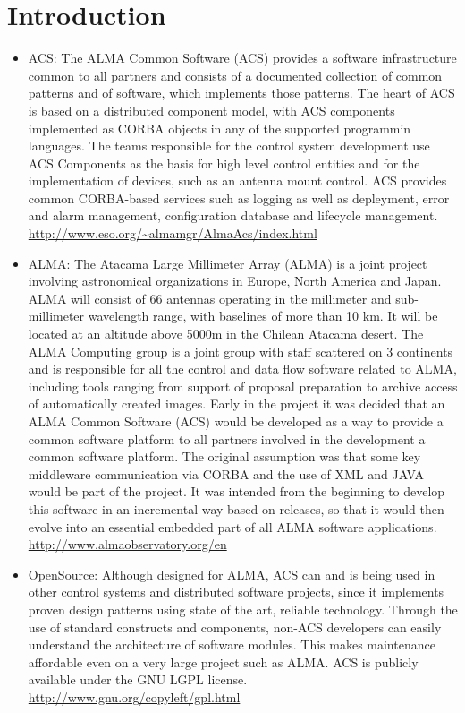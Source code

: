 \section{Introduction}
\begin{itemize}
	\item ACS: The ALMA Common Software (ACS) provides a software infrastructure common to all partners and consists of a documented collection of common patterns 
		and of software, which implements those patterns. The heart of ACS is based on a distributed component model, with ACS components implemented as CORBA
		objects in any of the supported programmin languages. The teams responsible for the control system development use ACS Components as the basis for 
		high level control entities and for the implementation of devices, such as an antenna mount control. ACS provides common CORBA-based services such as 
		logging as well as depleyment, error and alarm management, configuration database and lifecycle management.
		\url{http://www.eso.org/~almamgr/AlmaAcs/index.html}
	\item  ALMA: The Atacama Large Millimeter Array (ALMA) is a joint project involving astronomical organizations in Europe, North America and Japan. ALMA will 
		consist of 66 antennas operating in the millimeter and sub-millimeter wavelength range, with baselines of more than 10 km. It will be located at an 
		altitude above 5000m in the Chilean Atacama desert. The ALMA Computing group is a joint group with staff scattered on 3 continents and is responsible 
		for all the control and data flow software related to ALMA, including tools ranging from support of proposal preparation to archive access of 
		automatically created images. Early in the project it was decided that an ALMA Common Software (ACS) would be developed as a way to provide a common
		software platform to all 
		partners involved in the development a common software platform. The original assumption was that some key middleware communication via CORBA and 
		the use of XML and JAVA would be part of the project. It was intended from the beginning to develop this software in an incremental way based on 
		releases, so that it would then evolve into an essential embedded part of all ALMA software applications.
		\url{http://www.almaobservatory.org/en}
	\item OpenSource: Although designed for ALMA, ACS can and is being used in other control systems and distributed software projects, since it implements proven 
		design patterns using state of the art, reliable technology. Through the use of standard constructs and components, non-ACS developers can easily 
		understand the architecture of software modules. This makes maintenance affordable even on a very large project such as ALMA. ACS is publicly 
		available under the GNU LGPL license.
		\url{http://www.gnu.org/copyleft/gpl.html}
\end{itemize}

